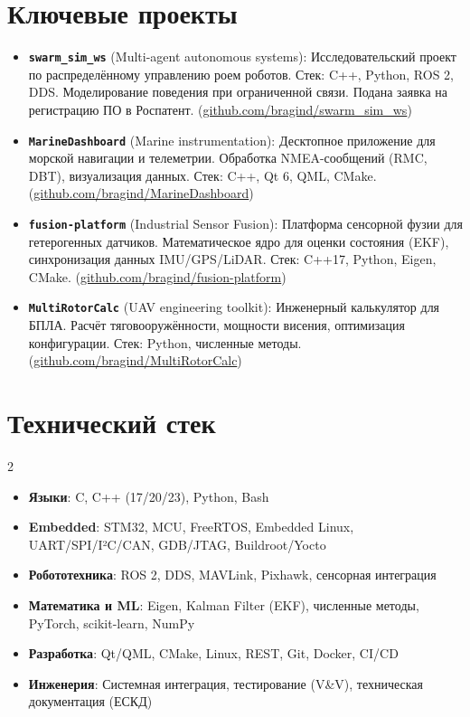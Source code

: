 \documentclass[10pt,a4paper]{article}
\begin{document}
\section*{Ключевые проекты}
\begin{itemize}
    \item \textbf{\texttt{swarm\_sim\_ws}} (Multi-agent autonomous systems): Исследовательский проект по распределённому управлению роем роботов. Стек: C++, Python, ROS 2, DDS. Моделирование поведения при ограниченной связи. Подана заявка на регистрацию ПО в Роспатент. (\href{https://github.com/bragind/swarm_sim_ws}{github.com/bragind/swarm\_sim\_ws})
    \item \textbf{\texttt{MarineDashboard}} (Marine instrumentation): Десктопное приложение для морской навигации и телеметрии. Обработка NMEA-сообщений (RMC, DBT), визуализация данных. Стек: C++, Qt 6, QML, CMake. (\href{https://github.com/bragind/MarineDashboard}{github.com/bragind/MarineDashboard})
    \item \textbf{\texttt{fusion-platform}} (Industrial Sensor Fusion): Платформа сенсорной фузии для гетерогенных датчиков. Математическое ядро для оценки состояния (EKF), синхронизация данных IMU/GPS/LiDAR. Стек: C++17, Python, Eigen, CMake. (\href{https://github.com/bragind/fusion-platform}{github.com/bragind/fusion-platform})
    \item \textbf{\texttt{MultiRotorCalc}} (UAV engineering toolkit): Инженерный калькулятор для БПЛА. Расчёт тяговооружённости, мощности висения, оптимизация конфигурации. Стек: Python, численные методы. (\href{https://github.com/bragind/MultiRotorCalc}{github.com/bragind/MultiRotorCalc})
\end{itemize}

\section*{Технический стек}
\begin{multicols}{2}
\begin{itemize}
    \item \textbf{Языки}: C, C++ (17/20/23), Python, Bash
    \item \textbf{Embedded}: STM32, MCU, FreeRTOS, Embedded Linux, UART/SPI/I²C/CAN, GDB/JTAG, Buildroot/Yocto
    \item \textbf{Робототехника}: ROS 2, DDS, MAVLink, Pixhawk, сенсорная интеграция
    \item \textbf{Математика и ML}: Eigen, Kalman Filter (EKF), численные методы, PyTorch, scikit-learn, NumPy
    \item \textbf{Разработка}: Qt/QML, CMake, Linux, REST, Git, Docker, CI/CD
    \item \textbf{Инженерия}: Системная интеграция, тестирование (V\&V), техническая документация (ЕСКД)
\end{itemize}
\end{multicols}
\end{document}
